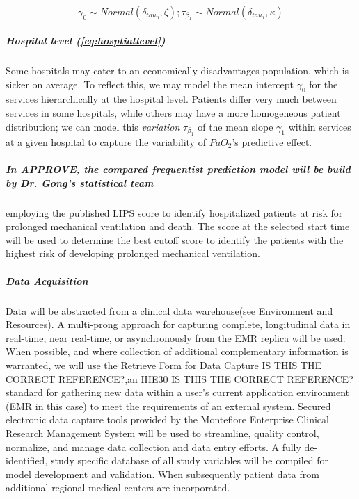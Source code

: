 \documentclass[11pt,notitlepage]{article}
\begin{document}
\begin{figure}
\vspace{-10pt}
\begin{equation} \label{eq:hosptiallevel}
\gamma_0 \sim Normal (\delta_{tau_{0}}, \zeta); \tau_{\beta_1} \sim Normal(\delta_{tau_{1}}, \kappa) 
\end{equation}
\vspace{-25pt}
\end{figure}

\subparagraph*{Hospital level (\ref{eq:hosptiallevel})}
Some hospitals may cater to an economically disadvantages population, which is sicker on average. To reflect this, we may  model the mean intercept $\gamma_0$ for the services hierarchically at the hospital level. Patients differ very much between services in some hospitals, while others may have a more homogeneous patient distribution; we can model this \textit{variation} $\tau_{\beta_1}$ of the mean slope $\gamma_1$ within services at a given hospital to capture the variability of $PaO_2$'s predictive effect.
 
\subparagraph*{In APPROVE, the compared frequentist prediction model will be build by Dr. Gong's statistical team} employing the published LIPS score \cite{Herridge_12594312} to identify hospitalized patients at risk for prolonged mechanical ventilation and death. The score at the selected start time will be used to determine the best cutoff score to identify the patients with the highest risk of developing prolonged mechanical ventilation.

\subparagraph*{Data Acquisition}
Data will be abstracted from a clinical data warehouse(see Environment and Resources). A multi-prong approach for capturing complete, longitudinal data in real-time, near real-time, or asynchronously from the EMR replica will be used. When possible, and where collection of additional complementary information is warranted, we will use the Retrieve Form for Data Capture IS THIS THE CORRECT REFERENCE?\cite{Rothenhaeusler_2005},an IHE30 IS THIS THE CORRECT REFERENCE? \cite{Rotte_15809512} standard for gathering new data within a user's current application environment (EMR in this case) to meet the requirements of an external system. Secured electronic data capture tools provided by the Montefiore Enterprise Clinical Research Management System will be used to streamline, quality control, normalize, and manage data collection and data entry efforts. A fully de-identified, study specific database of all study variables will be compiled for model development and validation. When subsequently patient data from additional regional medical centers are incorporated.
\end{document}
